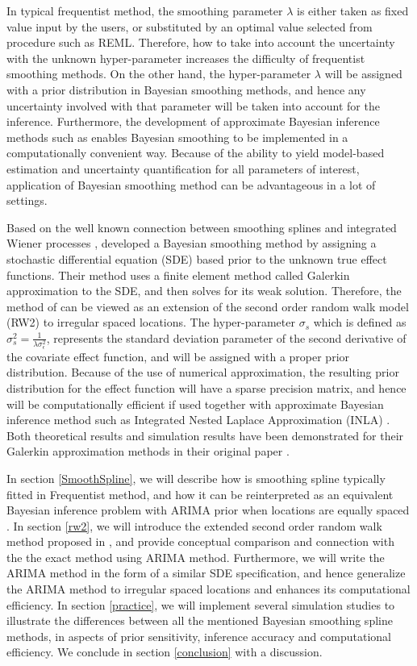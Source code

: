 \documentclass{article}
\begin{document}
In typical frequentist method, the smoothing parameter $\lambda$ is either taken as fixed value input by the users, or substituted by an optimal value selected from procedure such as REML. Therefore, how to take into account the uncertainty with the unknown hyper-parameter increases the difficulty of frequentist smoothing methods. On the other hand, the hyper-parameter $\lambda$ will be assigned with a prior distribution in Bayesian smoothing methods, and hence any uncertainty involved with that parameter will be taken into account for the inference. Furthermore, the development of approximate Bayesian inference methods such as \cite{inla} enables Bayesian smoothing to be implemented in a computationally convenient way. Because of the ability to yield model-based estimation and uncertainty quantification for all parameters of interest, application of Bayesian smoothing method can be advantageous in a lot of settings.


Based on the well known connection between smoothing splines and integrated Wiener processes \citep{wahba}, \cite{rw2} developed a Bayesian smoothing method by assigning a stochastic differential equation (SDE) based prior to the unknown true effect functions. 
Their method uses a finite element method called Galerkin approximation to the SDE, and then solves for its weak solution. Therefore, the method of \cite{inla} can be viewed as an extension of the second order random walk model (RW2) to irregular spaced locations.
The hyper-parameter $\sigma_s$ which is defined as $\sigma_s^2 = \frac{1}{ \lambda \sigma_\epsilon^2}$, represents the standard deviation parameter of the second derivative of the covariate effect function, and will be assigned with a proper prior distribution. Because of the use of numerical approximation, the resulting prior distribution for the effect function will have a sparse precision matrix, and hence will be computationally efficient if used together with approximate Bayesian inference method such as Integrated Nested Laplace Approximation (INLA) \citep{inla}. Both theoretical results and simulation results have been demonstrated for their Galerkin approximation methods in their original paper \citep{rw2}.


In section \ref{SmoothSpline}, we will describe how is smoothing spline typically fitted in Frequentist method, and how it can be reinterpreted as an equivalent Bayesian inference problem with ARIMA prior when locations are equally spaced \citep{ARIMA}. In section \ref{rw2}, we will introduce the extended second order random walk method proposed in \cite{rw2}, and provide conceptual comparison and connection with the the exact method using ARIMA method. Furthermore, we will write the ARIMA method in the form of a similar SDE specification, and hence generalize the ARIMA method to irregular spaced locations and enhances its computational efficiency. In section \ref{practice}, we will implement several simulation studies to illustrate the differences between all the mentioned Bayesian smoothing spline methods, in aspects of prior sensitivity, inference accuracy and computational efficiency. We conclude in section \ref{conclusion} with a discussion.
\end{document}
